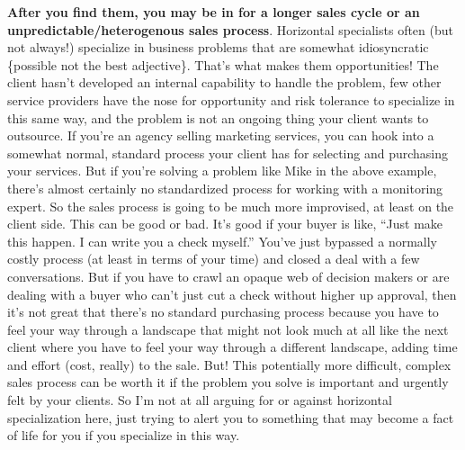 \textbf{After you find them, you may be in for a longer sales cycle or an unpredictable/heterogenous sales process}. Horizontal specialists often (but not always!) specialize in business problems that are somewhat idiosyncratic \{possible not the best adjective\}. That's what makes them opportunities! The client hasn't developed an internal capability to handle the problem, few other service providers have the nose for opportunity and risk tolerance to specialize in this same way, and the problem is not an ongoing thing your client wants to outsource. If you're an agency selling marketing services, you can hook into a somewhat normal, standard process your client has for selecting and purchasing your services. But if you're solving a problem like Mike in the above example, there's almost certainly no standardized process for working with a monitoring expert. So the sales process is going to be much more improvised, at least on the client side. This can be good or bad. It's good if your buyer is like, ``Just make this happen. I can write you a check myself.'' You've just bypassed a normally costly process (at least in terms of your time) and closed a deal with a few conversations. But if you have to crawl an opaque web of decision makers or are dealing with a buyer who can't just cut a check without higher up approval, then it's not great that there's no standard purchasing process because you have to feel your way through a landscape that might not look much at all like the next client where you have to feel your way through a different landscape, adding time and effort (cost, really) to the sale. But! This potentially more difficult, complex sales process can be worth it if the problem you solve is important and urgently felt by your clients. So I'm not at all arguing for or against horizontal specialization here, just trying to alert you to something that may become a fact of life for you if you specialize in this way.


